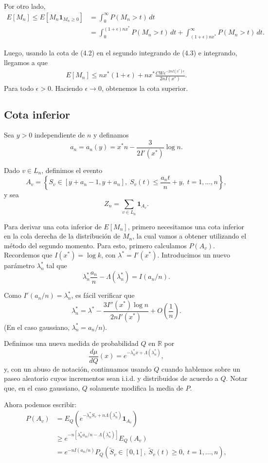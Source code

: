 \documentclass[12pt]{report}
\begin{document}
Por otro lado,
\begin{align}
E[M_n] \leq E[M_n \mathbf{1}_{M_n \geq 0}] &= \int_{0}^{\infty} P(M_n > t) \, dt \nonumber\\
&= \int_{0}^{(1+\epsilon)nx^*} P(M_n > t) \, dt + \int_{(1+\epsilon)nx^*}^{\infty} P(M_n > t) \, dt. \nonumber
\end{align}

Luego, usando la cota de (4.2) en el segundo integrando de (4.3) e integrando, llegamos a que
\begin{align}
E[M_n] \leq nx^*(1+\epsilon) + nx^* \frac{CWe^{-2nI(x^*)\epsilon}}{2nI(x^*)}.
\end{align}
Para todo $\epsilon > 0$. Haciendo $\epsilon \to 0$, obtenemos la cota superior.

\subsection{Cota inferior}

Sea $y > 0$ independiente de $n$ y definamos
\[
a_n = a_n(y) = x^*n - \frac{3}{2I'(x^*)} \log n.
\]

Dado $v \in L_n$, definimos el evento
\[
A_v = \left\{ S_v \in [y + a_n - 1, y + a_n],\; S_v(t) \leq \frac{a_n t}{n} + y,\; t = 1, \dots, n \right\},
\]
y sea
\[
Z_n = \sum_{v \in L_n} \mathbf{1}_{A_v}.
\]

Para derivar una cota inferior de $E[M_n]$, primero necesitamos una cota inferior en la
cola derecha de la distribución de $M_n$, la cual vamos a obtener utilizando el método del segundo momento. 
Para esto, primero calculamos $P(A_v)$. Recordemos que $I(x^*) = \log k$, con $\lambda^* = I'(x^*)$. 
Introducimos un nuevo parámetro $\lambda_{n}^{*}$ tal que
\[
\lambda_{n}^{*} \frac{a_n}{n} - \Lambda(\lambda_{n}^{*}) = I(a_n/n).
\]

Como $I'(a_n/n) = \lambda_{n}^{*}$, es fácil verificar que
\[
\lambda_{n}^{*} = 
\lambda^* - \frac{3 I''(x^*) \log n}{2n I'(x^*)} + O\left(\frac{1}{n}\right).
\]
(En el caso gaussiano, $\lambda_{n}^{*} = a_n / n$).

Definimos una nueva medida de probabilidad $Q$ en $\mathbb{R}$ por
\[
\frac{d\mu}{dQ}(x) = e^{-\lambda_{n}^{*}x + \Lambda(\lambda_{n}^{*})},
\]
y, con un abuso de notación, continuamos usando $Q$ cuando hablemos sobre un paseo aleatorio 
cuyos incrementos sean i.i.d. y distribuidos de acuerdo a $Q$. Notar que, en el caso gaussiano, 
$Q$ solamente modifica la media de $P$. 

Ahora podemos escribir:
\begin{align}
P(A_v) &= E_Q \left(e^{-\lambda_n^* S_v + n \Lambda(\lambda_n^*)} \mathbf{1}_{A_v} \right) \nonumber \\
&\geq e^{-n [\lambda_n^* a_n/n - \Lambda(\lambda_n^*)]} E_Q(A_v) \\
&= e^{-n I(a_n/n)} P_Q \left( \tilde{S}_v \in [0,1],\; \tilde{S}_v(t) \geq 0,\; t = 1, \dots, n \right), \nonumber 
\end{align}
\end{document}

